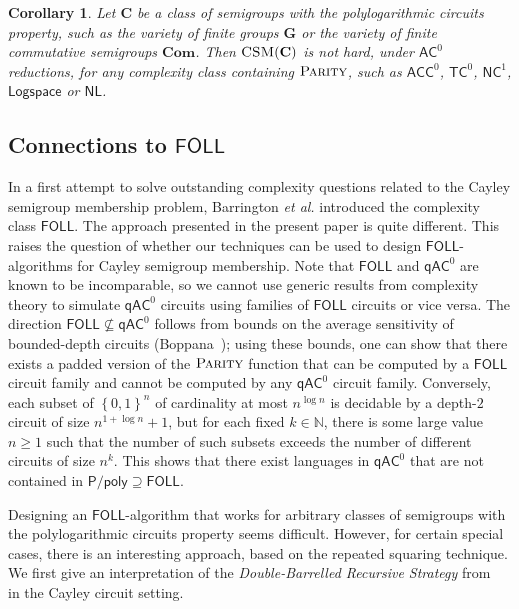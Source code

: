 \documentclass[11pt]{article}
\numberwithin{equation}{section}
\newtheorem{corollary}[theorem]{Corollary}
\theoremstyle{definition}
\theoremstyle{plain}
\newcommand{\N}{\mathbb N}
\renewcommand{\geq}{\geqslant}
\renewcommand{\ge}{\geq}
\newcommand{\os}[1]{\ensuremath{\left\{#1\right\}}}
\newcommand{\FOLL}{\ensuremath{\mathsf{FOLL}}}
\newcommand{\AC}{\ensuremath{\mathsf{AC}}}
\newcommand{\ACC}{\ensuremath{\mathsf{ACC}}}
\newcommand{\qAC}{\ensuremath{\mathsf{qAC}}}
\newcommand{\TC}{\ensuremath{\mathsf{TC}}}
\newcommand{\NC}{\ensuremath{\mathsf{NC}}}
\newcommand{\LOGSPACE}{\ensuremath{\mathsf{Logspace}}}
\newcommand{\NL}{\ensuremath{\mathsf{NL}}}
\newcommand{\Ppoly}{\ensuremath{\mathsf{P / poly}}}
\newcommand{\vC}{\mathbf{C}}
\newcommand{\vCom}{\mathbf{Com}}
\newcommand{\vG}{\mathbf{G}}
\newcommand{\CSM}{\ensuremath{\textsc{CSM}}}
\newcommand{\Parity}{\ensuremath{\textsc{Parity}}}
\newcommand{\SCSM}{Cayley semigroup membership}
\newcommand{\SCSMP}{{\SCSM} problem}
\newcommand{\SPLCP}{polylogarithmic circuits property}
\begin{document}
\begin{corollary}
  Let $\vC$ be a class of semigroups with the {\SPLCP}, such as the variety of
  finite groups $\vG$ or the variety of finite commutative semigroups $\vCom$.
%
  Then $\CSM(\vC)$ is not hard,
  under $\AC^0$ reductions,  %
for any complexity class containing $\Parity$,
  such as $\ACC^0$, $\TC^0$, $\NC^1$, $\LOGSPACE$ or $\NL$.
%
  \label{crl:parity}
\end{corollary}


\subsection{Connections to \texorpdfstring{$\FOLL$}{FOLL}}
\label{sec:foll}

In a first attempt to solve outstanding complexity questions related to the
{\SCSMP}, Barrington {\it et al.} introduced the complexity class $\FOLL$. The
approach presented in the present paper is quite different. This raises the
question of whether our techniques can be used to design $\FOLL$-algorithms for
{\SCSM}.
%
Note that $\FOLL$ and $\qAC^0$ are known to be incomparable, so we cannot
use generic results from complexity theory to simulate $\qAC^0$ circuits using
families of $\FOLL$ circuits or vice versa.
%
The direction $\FOLL \not\subseteq \qAC^0$ follows from bounds on the average
sensitivity of bounded-depth
%
circuits (Boppana~\cite{Boppana97});  %
using these bounds, one
can show that there exists a padded version of the $\Parity$ function that can
be computed by a $\FOLL$ circuit family and cannot be computed by any $\qAC^0$
circuit family.
%
Conversely, each subset of $\os{0, 1}^n$ of cardinality at most $n^{\log n}$ is
decidable by a depth-$2$ circuit of size $n^{1+\log n} + 1$, but for each fixed
$k \in \N$, there is some large value $n \ge 1$ such that the number of such
subsets exceeds the number of different circuits of size $n^k$.
%
This shows that there exist languages in $\qAC^0$ that are not contained in
$\Ppoly \supseteq \FOLL$.

Designing an $\FOLL$-algorithm that works for arbitrary classes of semigroups
with the {\SPLCP} seems difficult.
%
However, for certain special cases, there is an interesting approach, based on
the repeated squaring technique.
%
We first give an interpretation of the \emph{Double-Barrelled Recursive
Strategy} from~\cite{BarringtonKLM01} in the Cayley circuit setting.
\end{document}

